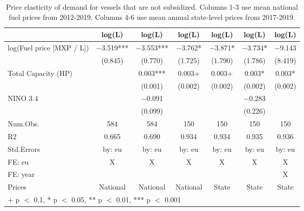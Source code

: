 \begin{table}

\caption{\label{tab:}Price elasticity of demand for vessels that are not subsidized.
             Columns 1-3 use mean national fuel prices from 2012-2019.
             Columns 4-6 use mean annual state-level prices from 2017-2019.}
\centering
\begin{tabular}[t]{lcccccc}
\toprule
  & log(L) & log(L)  & log(L)   & log(L)    & log(L)     & log(L)     \\
\midrule
log(Fuel price [MXP / L]) & \num{-3.519}*** & \num{-3.553}*** & \num{-3.762}* & \num{-3.871}* & \num{-3.734}* & \num{-9.143}\\
 & (\num{0.845}) & (\num{0.770}) & (\num{1.725}) & (\num{1.790}) & (\num{1.786}) & (\num{8.419})\\
Total Capacity (HP) &  & \num{0.003}*** & \num{0.003}+ & \num{0.003}+ & \num{0.003}* & \num{0.003}*\\
 &  & (\num{0.001}) & (\num{0.002}) & (\num{0.002}) & (\num{0.002}) & (\num{0.002})\\
NINO 3.4 &  & \num{-0.091} &  &  & \num{-0.283} & \\
 &  & (\num{0.099}) &  &  & (\num{0.226}) & \\
\midrule
Num.Obs. & \num{584} & \num{584} & \num{150} & \num{150} & \num{150} & \num{150}\\
R2 & \num{0.665} & \num{0.690} & \num{0.934} & \num{0.934} & \num{0.935} & \num{0.936}\\
Std.Errors & by: eu & by: eu & by: eu & by: eu & by: eu & by: eu\\
FE: eu & X & X & X & X & X & X\\
FE: year &  &  &  &  &  & X\\
Prices & National & National & National & State & State & State\\
\bottomrule
\multicolumn{7}{l}{\rule{0pt}{1em}+ p $<$ 0.1, * p $<$ 0.05, ** p $<$ 0.01, *** p $<$ 0.001}\\
\end{tabular}
\end{table}

